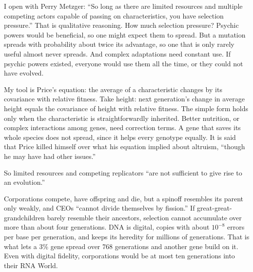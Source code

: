 
I open with Perry Metzger: ``So long as there are limited resources and multiple competing actors capable of passing on characteristics, you have selection pressure.'' That is qualitative reasoning. How much selection pressure? Psychic powers would be beneficial, so one might expect them to spread. But a mutation spreads with probability about twice its advantage, so one that is only rarely useful almost never spreads. And complex adaptations need constant use. If psychic powers existed, everyone would use them all the time, or they could not have evolved.

My tool is Price's equation: the average of a characteristic changes by its covariance with relative fitness. Take height: next generation's change in average height equals the covariance of height with relative fitness. The simple form holds only when the characteristic is straightforwardly inherited. Better nutrition, or complex interactions among genes, need correction terms. A gene that saves its whole species does not spread, since it helps every genotype equally.  It is said that Price killed himself over what his equation implied about altruism, ``though he may have had other issues.''

So limited resources and competing replicators ``are not sufficient to give rise to an evolution.'' 

Corporations compete, have offspring and die, but a spinoff resembles its parent only weakly, and CEOs ``cannot divide themselves by fission.'' If great-great-grandchildren barely resemble their ancestors, selection cannot accumulate over more than about four generations. DNA is digital, copies with about $10^{-8}$ errors per base per generation, and keeps its heredity for millions of generations. That is what lets a 3\% gene spread over 768 generations and another gene build on it. Even with digital fidelity, corporations would be at most ten generations into their RNA World. 

